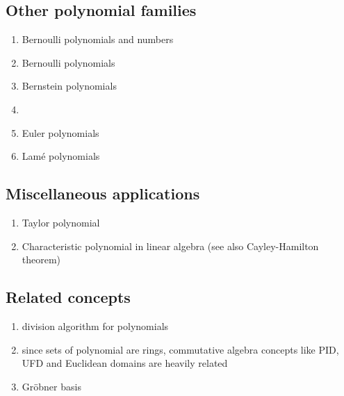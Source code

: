 \documentclass[12pt]{article}
\begin{document}
\subsection*{Other polynomial families}
\begin{enumerate}
\item Bernoulli polynomials and numbers
\item Bernoulli polynomials
\item Bernstein polynomials
\item {}
\item Euler polynomials
\item Lam\'e polynomials


\end{enumerate}

\subsection*{Miscellaneous applications}
\begin{enumerate}
\item Taylor polynomial 
\item Characteristic polynomial in linear algebra (see also 
Cayley-Hamilton theorem)
\end{enumerate}


\subsection*{Related concepts}
\begin{enumerate}
\item division algorithm for polynomials
\item since sets of polynomial are rings, commutative algebra concepts like PID, UFD and Euclidean domains are heavily related
\item Gr\"obner basis
\end{enumerate}
\end{document}
